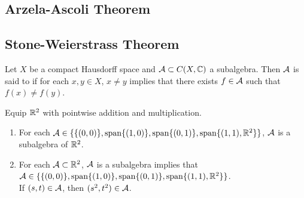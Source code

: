 \documentclass{book}
\begin{document}
	
	
\subsection{Arzela-Ascoli Theorem}



































\subsection{Stone-Weierstrass Theorem}
	
\begin{defn}
	Let $X$ be a compact Hausdorff space and $\mathcal{A} \subset C(X, \mathbb{C})$ a subalgebra. Then $\mathcal{A}$ is said to  if for each $x,y \in X$, $x \neq y$ implies that there exists $f \in \mathcal{A}$ such that $f(x) \neq f(y)$. 
\end{defn}

\begin{ex}
	Equip $\mathbb{R}^2$ with pointwise addition and multiplication. 
	\begin{enumerate}
		\item For each $\mathcal{A} \in \{ \{(0,0)\}, \operatorname{span} \{(1, 0)\}, \operatorname{span} \{(0,1)\}, \operatorname{span}\{ (1,1), \mathbb{R}^2 \} \}$, $\mathcal{A}$ is a subalgebra of $\mathbb{R}^2$. 
		\item For each $\mathcal{A} \subset \mathbb{R}^2$, $\mathcal{A}$ is a subalgebra implies that $\mathcal{A} \in \{ \{(0,0)\}, \operatorname{span} \{(1, 0)\}, \operatorname{span} \{(0,1)\}, \operatorname{span}\{ (1,1), \mathbb{R}^2 \} \}$. \\
		 If $(s,t) \in \mathcal{A}$, then $(s^2, t^2) \in \mathcal{A}$. 
	\end{enumerate}
\end{ex}
\end{document}
